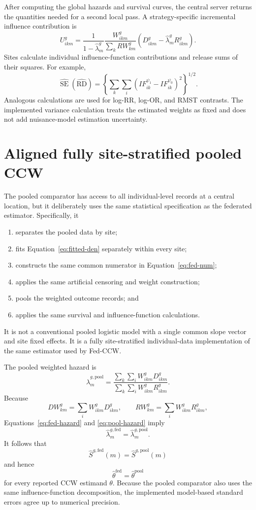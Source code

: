 \documentclass[11pt]{article}
\begin{document}
After computing the global hazards and survival curves, the central server
returns the quantities needed for a second local pass. A strategy-specific
incremental influence contribution is
\[
  U^g_{ikm}
  =\frac{1}{1-\widehat\lambda^g_m}
   \frac{W^g_{ikm}}{\sum_k RW^g_{km}}
   \left(D^g_{ikm}-\widehat\lambda^g_mR^g_{ikm}\right).
\]
Sites calculate individual influence-function contributions and release sums
of their squares. For example,
\[
  \widehat{\operatorname{SE}}(\widehat{\mathrm{RD}})
  =\left\{
      \sum_k\sum_i
      \left(IF^{\psi_1}_{ik}-IF^{\psi_0}_{ik}\right)^2
    \right\}^{1/2}.
\]
Analogous calculations are used for log-RR, log-OR, and RMST contrasts. The
implemented variance calculation treats the estimated weights as fixed and
does not add nuisance-model estimation uncertainty.

\section{Aligned fully site-stratified pooled CCW}

The pooled comparator has access to all individual-level records at a central
location, but it deliberately uses the same statistical specification as the
federated estimator. Specifically, it
\begin{enumerate}[leftmargin=2em]
  \item separates the pooled data by site;
  \item fits Equation~\eqref{eq:fitted-den} separately within every site;
  \item constructs the same common numerator in Equation~\eqref{eq:fed-num};
  \item applies the same artificial censoring and weight construction;
  \item pools the weighted outcome records; and
  \item applies the same survival and influence-function calculations.
\end{enumerate}
It is not a conventional pooled logistic model with a single common slope
vector and site fixed effects. It is a fully site-stratified individual-data
implementation of the same estimator used by Fed-CCW.

The pooled weighted hazard is
\begin{equation}
\label{eq:pool-hazard}
  \widehat\lambda^{g,\mathrm{pool}}_m
  =\frac{
      \sum_k\sum_i W^g_{ikm}D^g_{ikm}
    }{
      \sum_k\sum_i W^g_{ikm}R^g_{ikm}
    }.
\end{equation}
Because
\[
  DW^g_{km}=\sum_iW^g_{ikm}D^g_{ikm},
  \qquad
  RW^g_{km}=\sum_iW^g_{ikm}R^g_{ikm},
\]
Equations~\eqref{eq:fed-hazard} and \eqref{eq:pool-hazard} imply
\[
  \widehat\lambda^{g,\mathrm{fed}}_m
  =\widehat\lambda^{g,\mathrm{pool}}_m.
\]
It follows that
\[
  \widehat S^{g,\mathrm{fed}}(m)
  =\widehat S^{g,\mathrm{pool}}(m)
\]
and hence
\[
  \widehat\theta^{\mathrm{fed}}
  =\widehat\theta^{\mathrm{pool}}
\]
for every reported CCW estimand $\theta$. Because the pooled comparator also
uses the same influence-function decomposition, the implemented model-based
standard errors agree up to numerical precision.
\end{document}
